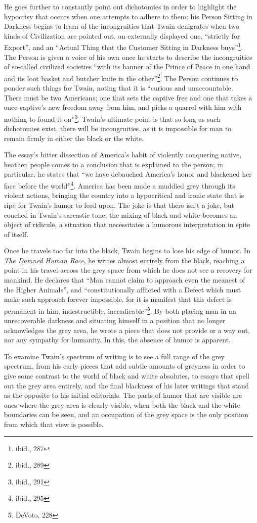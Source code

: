 He goes further to constantly point out dichotomies in order to highlight the
hypocrisy that occurs when one attempts to adhere to them; his Person Sitting in
Darkness begins to learn of the incongruities that Twain denigrates when two
kinds of Civilization are pointed out, an externally displayed one, ``strictly
for Export'', and an ``Actual Thing that the Customer Sitting in Darkness
buys''\footnote{ibid., 287}. The Person is given a voice of his own once he
starts to describe the incongruities of so-called civilized societies ``with its
banner of the Prince of Peace in one hand and its loot basket and butcher knife
in the other''\footnote{ibid., 289}. The Person continues to ponder such things
for Twain, noting that it is ``curious and unaccountable. There must be two
Americans; one that sets the captive free and one that takes a once-captive's
new freedom away from him, and picks a quarrel with him with nothing to found it
on''\footnote{ibid., 291}. Twain's ultimate point is that so long as such
dichotomies exist, there will be incongruities, as it is impossible for man to
remain firmly in either the black or the white.

The essay's bitter dissection of America's habit of violently conquering native,
heathen people comes to a conclusion that is explained to the person; in
particular, he states that ``we have debauched America's honor and blackened her
face before the world''\footnote{ibid., 295}. America has been made a muddied
grey through its violent actions, bringing the country into a hypocritical and
ironic state that is ripe for Twain's humor to feed upon. The joke is that there
isn't a joke, but couched in Twain's sarcastic tone, the mixing of black and
white becomes an object of ridicule, a situation that necessitates a humorous
interpretation in spite of itself.

Once he travels too far into the black, Twain begins to lose his edge of humor.
In \textit{The Damned Human Race}, he writes almost entirely from the black,
reaching a point in his travel across the grey space from which he does not see
a recovery for mankind. He declares that ``Man cannot claim to approach even the
meanest of the Higher Animals'', and ``constitutionally afflicted with a Defect
which must make such approach forever impossible, for it is manifest that this
defect is permanent in him, indestructible, ineradicable''\footnote{DeVoto,
228}. By both placing man in an unrecoverable darkness and situating himself in
a position that no longer acknowledges the grey area, he wrote a piece that does
not provide or a way out, nor any sympathy for humanity. In this, the absence of
humor is apparent.

To examine Twain's spectrum of writing is to see a full range of the grey
spectrum, from his early pieces that add subtle amounts of greyness in order to
give some contrast to the world of black and white absolutes, to essays that
spell out the grey area entirely, and the final blackness of his later writings
that stand as the opposite to his initial editorials. The parts of humor that
are visible are ones where the grey area is clearly visible, when both the black
and the white boundaries can be seen, and an occupation of the grey space is the
only position from which that view is possible.
